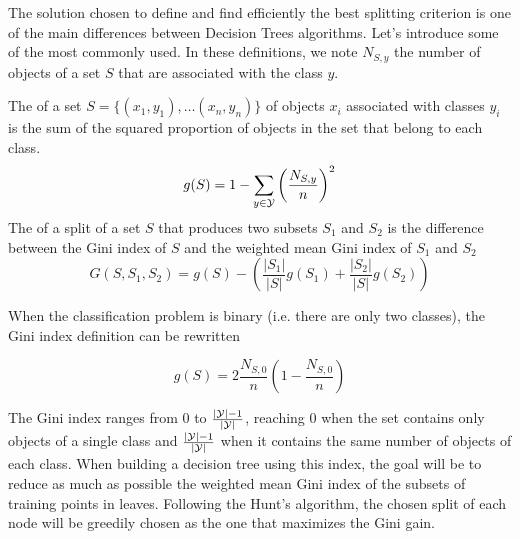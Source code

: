 The solution chosen to define and find efficiently the best splitting criterion is one of the main differences between Decision Trees algorithms. Let's introduce some of the most commonly used. In these definitions, we note $N_{S, y}$ the number of objects of a set $S$ that are associated with the class $y$.

\begin{definition}
    The  of a set $S = \{(x_1, y_1), \dots\allowbreak (x_n, y_n)\}$ of objects $x_i$ associated with classes $y_i$ is the sum of the squared proportion of objects in the set that belong to each class.
    \begin{equation}\label{eq:general_gini_index_def}
        g(S) = 1 - \sum_{y \in \mathcal{Y}} \left(\frac{N_{S, y}}{n}\right)^2
    \end{equation}
    The  of a split of a set $S$ that produces two subsets $S_1$ and $S_2$ is the difference between the Gini index of $S$ and the weighted mean Gini index of $S_1$ and $S_2$
    \begin{equation}
        G(S, S_1, S_2) = g(S) - \left(\frac{|S_1|}{|S|} g(S_1) + \frac{|S_2|}{|S|} g(S_2)\right)
    \end{equation}
\end{definition}

When the classification problem is binary (i.e. there are only two classes), the Gini index definition can be rewritten

\begin{equation}
    g(S) = 2 \frac{N_{S, 0}}{n} \left(1 - \frac{N_{S, 0}}{n}\right)
\end{equation}

The Gini index ranges from $0$ to $\frac{|\mathcal{Y}| - 1}{|\mathcal{Y}|}$, reaching $0$ when the set contains only objects of a single class and $\frac{|\mathcal{Y}| - 1}{|\mathcal{Y}|}$ when it contains the same number of objects of each class. When building a decision tree using this index, the goal will be to reduce as much as possible the weighted mean Gini index of the subsets of training points in leaves. Following the Hunt's algorithm, the chosen split of each node will be greedily chosen as the one that maximizes the Gini gain.

